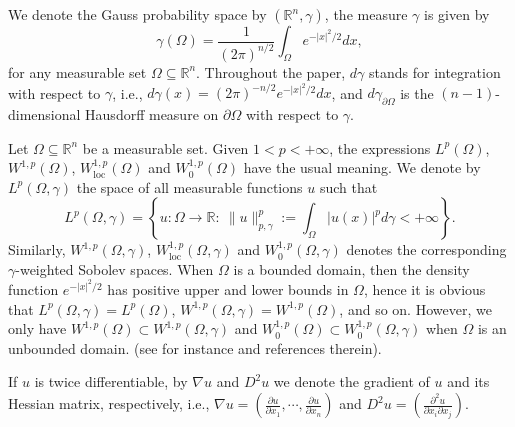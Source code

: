 \documentclass[12pt]{amsart}
\newcommand{\R}{\mathbb R}
\newcommand{\1}{\mathbf 1}
\begin{document}
We denote the Gauss probability space by $( \mathbb{R}^{n}, \gamma)$, the measure $\gamma$ is given by
$$
\gamma(\Omega)= \frac{1}{(2\pi)^{n/2}} \int_{\Omega} e^{-|x|^2/2} dx,
$$
for any measurable set $\Omega\subseteq \mathbb{R}^{n}$. Throughout the paper, $d\gamma$ stands for integration with respect to $\gamma$, i.e., $d\gamma(x)=(2\pi)^{-n/2} e^{-|x|^2/2}dx$, and $d\gamma_{\partial \Omega}$ is the $(n-1)$-dimensional Hausdorff measure on $\partial\Omega$ with respect to $\gamma$.

Let $\Omega\subseteq \R^n$ be a measurable set. Given $1<p<+\infty$, the expressions $L^p(\Omega)$, $W^{1,p}(\Omega)$,  $W^{1,p}_{\text{loc}}(\Omega)$ and $W^{1,p}_0(\Omega)$ have the usual meaning. We denote by $L^p(\Omega,\gamma)$ the space of all measurable functions $u$ such that
\begin{equation}\nonumber
L^p(\Omega,\gamma)=\left\{ u:\Omega\rightarrow \R:\ \|u\|^{p}_{p,\gamma}:=\int_{\Omega} |u(x)|^p d\gamma <+\infty \right\}.
\end{equation}
Similarly,
$W^{1,p}(\Omega,\gamma)$, $W^{1,p}_{\mathrm{loc}}(\Omega,\gamma)$ and
$W^{1,p}_0(\Omega,\gamma)$ denotes the corresponding $\gamma$-weighted Sobolev spaces. When $\Omega$ is a bounded domain, then the density function $e^{-|x|^2/2}$ has positive upper and lower bounds in $\Omega$, hence it is obvious that $L^p(\Omega,\gamma)=L^p(\Omega)$, $W^{1,p}(\Omega,\gamma)=W^{1,p}(\Omega)$, and so on. However, we only have $W^{1,p}(\Omega)\subset W^{1,p}(\Omega,\gamma)$ and $W^{1,p}_0(\Omega)\subset W^{1,p}_0(\Omega,\gamma)$ when $\Omega$ is an unbounded domain. (see for instance \cite{Heinonen2006,Tero1994,Radulescu2019} and references therein).

If $u$ is twice differentiable, by $\nabla u$ and $D^2 u$ we denote the gradient of $u$ and its Hessian matrix, respectively, i.e., $\nabla u=(\frac{\partial u}{\partial x_1},\cdots,\frac{\partial u}{\partial x_n})$ and $D^2u=(\frac{\partial^2 u}{\partial x_i \partial x_j})$.
\end{document}

